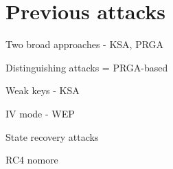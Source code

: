 \chapter{Previous attacks}

Two broad approaches - KSA, PRGA

Distinguishing attacks = PRGA-based



Weak keys - KSA


IV mode - WEP


State recovery attacks


RC4 nomore

